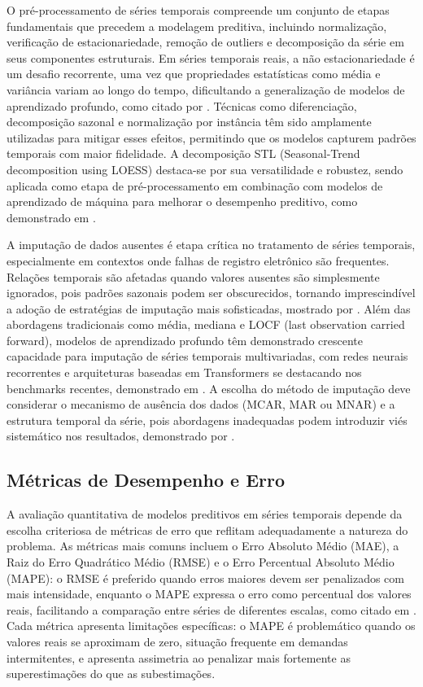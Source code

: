 \documentclass[
    12pt,
    openright,
    oneside,
    a4paper,
    english,
    brazil
]{abntex2}
\begin{document}
O pré-processamento de séries temporais compreende um conjunto de etapas fundamentais que precedem a modelagem preditiva, incluindo normalização, verificação de estacionariedade, remoção de outliers e decomposição da série em seus componentes estruturais. Em séries temporais reais, a não estacionariedade é um desafio recorrente, uma vez que propriedades estatísticas como média e variância variam ao longo do tempo, dificultando a generalização de modelos de aprendizado profundo, como citado por . Técnicas como diferenciação, decomposição sazonal e normalização por instância têm sido amplamente utilizadas para mitigar esses efeitos, permitindo que os modelos capturem padrões temporais com maior fidelidade. A decomposição STL (Seasonal-Trend decomposition using LOESS) destaca-se por sua versatilidade e robustez, sendo aplicada como etapa de pré-processamento em combinação com modelos de aprendizado de máquina para melhorar o desempenho preditivo, como demonstrado em .

A imputação de dados ausentes é etapa crítica no tratamento de séries temporais, especialmente em contextos onde falhas de registro eletrônico são frequentes. Relações temporais são afetadas quando valores ausentes são simplesmente ignorados, pois padrões sazonais podem ser obscurecidos, tornando imprescindível a adoção de estratégias de imputação mais sofisticadas, mostrado por . Além das abordagens tradicionais como média, mediana e LOCF (last observation carried forward), modelos de aprendizado profundo têm demonstrado crescente capacidade para imputação de séries temporais multivariadas, com redes neurais recorrentes e arquiteturas baseadas em Transformers se destacando nos benchmarks recentes, demonstrado em . A escolha do método de imputação deve considerar o mecanismo de ausência dos dados (MCAR, MAR ou MNAR) e a estrutura temporal da série, pois abordagens inadequadas podem introduzir viés sistemático nos resultados, demonstrado por .

\subsection{Métricas de Desempenho e Erro}
\label{subsec:metricas}

A avaliação quantitativa de modelos preditivos em séries temporais depende da escolha criteriosa de métricas de erro que reflitam adequadamente a natureza do problema. As métricas mais comuns incluem o Erro Absoluto Médio (MAE), a Raiz do Erro Quadrático Médio (RMSE) e o Erro Percentual Absoluto Médio (MAPE): o RMSE é preferido quando erros maiores devem ser penalizados com mais intensidade, enquanto o MAPE expressa o erro como percentual dos valores reais, facilitando a comparação entre séries de diferentes escalas, como citado em . Cada métrica apresenta limitações específicas: o MAPE é problemático quando os valores reais se aproximam de zero, situação frequente em demandas intermitentes, e apresenta assimetria ao penalizar mais fortemente as superestimações do que as subestimações.
\end{document}
